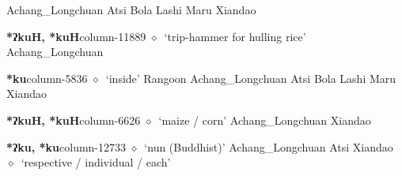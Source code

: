          Achang\_Longchuan 
\hspace{1ex}
         Atsi 
\hspace{1ex}
         Bola 
\hspace{1ex}
         Lashi 
\hspace{1ex}
         Maru 
\hspace{1ex}
         Xiandao 
  \item {\footnotesize \textbf{*ʔkuH, *kuH}}{\tiny column-11889}
         $\diamond$~`trip-hammer for hulling rice'
         Achang\_Longchuan 
  \item {\footnotesize \textbf{*ku}}{\tiny column-5836}
         $\diamond$~`inside'
         Rangoon 
\hspace{1ex}
         Achang\_Longchuan 
\hspace{1ex}
         Atsi 
\hspace{1ex}
         Bola 
\hspace{1ex}
         Lashi 
\hspace{1ex}
         Maru 
\hspace{1ex}
         Xiandao 
  \item {\footnotesize \textbf{*ʔkuH, *kuH}}{\tiny column-6626}
         $\diamond$~`maize / corn'
         Achang\_Longchuan 
\hspace{1ex}
         Xiandao 
  \item {\footnotesize \textbf{*ʔku, *ku}}{\tiny column-12733}
         $\diamond$~`nun (Buddhist)'
         Achang\_Longchuan 
\hspace{1ex}
         Atsi 
\hspace{1ex}
         Xiandao 
\hspace{1ex}
         $\diamond$~`respective / individual / each'
